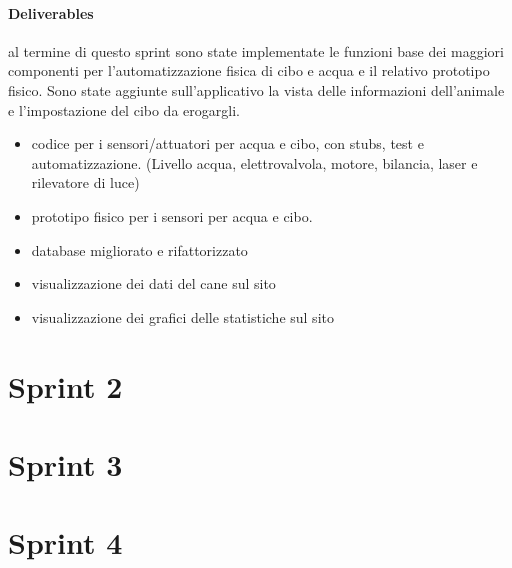 \paragraph{Deliverables}
al termine di questo sprint sono state implementate le funzioni base dei maggiori componenti per l'automatizzazione fisica di cibo e acqua e il relativo prototipo fisico. Sono state aggiunte sull'applicativo la vista delle informazioni dell'animale e l'impostazione del cibo da erogargli. 
\begin{itemize}
    \item codice per i sensori/attuatori per acqua e cibo, con stubs, test e automatizzazione. (Livello acqua, elettrovalvola, motore, bilancia, laser e rilevatore di luce)
    \item prototipo fisico per i sensori per acqua e cibo. 
    \item database migliorato e rifattorizzato
    \item visualizzazione dei dati del cane sul sito 
    \item visualizzazione dei grafici delle statistiche sul sito 
\end{itemize}

\section{Sprint 2}


\section{Sprint 3}


\section{Sprint 4}



